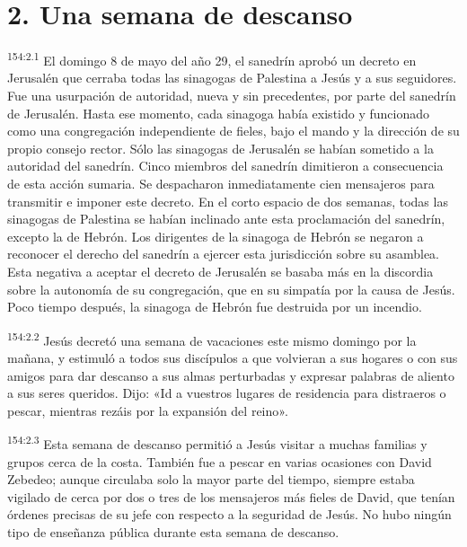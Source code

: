 \section*{2. Una semana de descanso}
\par
\textsuperscript{154:2.1} El domingo 8 de mayo del año 29, el sanedrín aprobó un decreto en Jerusalén que cerraba todas las sinagogas de Palestina a Jesús y a sus seguidores. Fue una usurpación de autoridad, nueva y sin precedentes, por parte del sanedrín de Jerusalén. Hasta ese momento, cada sinagoga había existido y funcionado como una congregación independiente de fieles, bajo el mando y la dirección de su propio consejo rector. Sólo las sinagogas de Jerusalén se habían sometido a la autoridad del sanedrín. Cinco miembros del sanedrín dimitieron a consecuencia de esta acción sumaria. Se despacharon inmediatamente cien mensajeros para transmitir e imponer este decreto. En el corto espacio de dos semanas, todas las sinagogas de Palestina se habían inclinado ante esta proclamación del sanedrín, excepto la de Hebrón. Los dirigentes de la sinagoga de Hebrón se negaron a reconocer el derecho del sanedrín a ejercer esta jurisdicción sobre su asamblea. Esta negativa a aceptar el decreto de Jerusalén se basaba más en la discordia sobre la autonomía de su congregación, que en su simpatía por la causa de Jesús. Poco tiempo después, la sinagoga de Hebrón fue destruida por un incendio.

\par
\textsuperscript{154:2.2} Jesús decretó una semana de vacaciones este mismo domingo por la mañana, y estimuló a todos sus discípulos a que volvieran a sus hogares o con sus amigos para dar descanso a sus almas perturbadas y expresar palabras de aliento a sus seres queridos. Dijo: «Id a vuestros lugares de residencia para distraeros o pescar, mientras rezáis por la expansión del reino».

\par
\textsuperscript{154:2.3} Esta semana de descanso permitió a Jesús visitar a muchas familias y grupos cerca de la costa. También fue a pescar en varias ocasiones con David Zebedeo; aunque circulaba solo la mayor parte del tiempo, siempre estaba vigilado de cerca por dos o tres de los mensajeros más fieles de David, que tenían órdenes precisas de su jefe con respecto a la seguridad de Jesús. No hubo ningún tipo de enseñanza pública durante esta semana de descanso.

